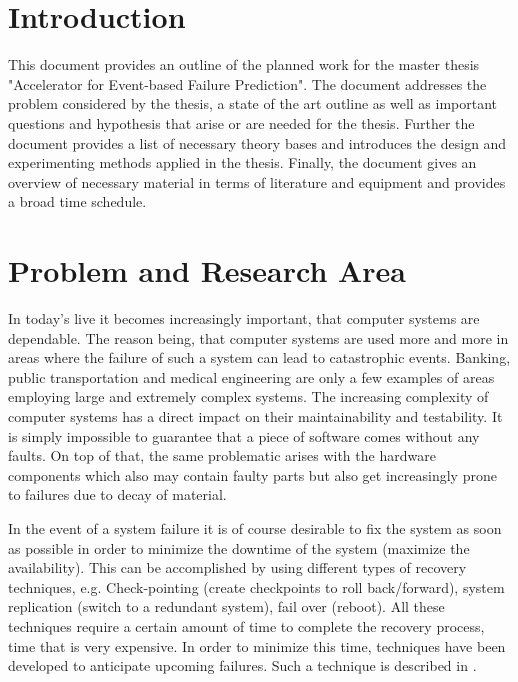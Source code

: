 \documentclass[12pt]{article} %
\begin{document}
\tableofcontents %

\newpage %


\section{Introduction} %

This document provides an outline of the planned work for the master thesis
"Accelerator for Event-based Failure Prediction". The document addresses the
problem considered by the thesis, a state of the art outline as well as
important questions and hypothesis that arise or are needed for the thesis.
Further the document provides a list of necessary theory bases and introduces
the design and experimenting methods applied in the thesis. Finally, the
document gives an overview of necessary material in terms of literature and
equipment and provides a broad time
schedule.


\section{Problem and Research Area} %

In today's live it becomes increasingly important, that computer systems are
dependable. The reason being, that computer systems are used more and more in
areas where the failure of such a system can lead to catastrophic events.
Banking, public transportation and medical engineering are only a few examples
of areas employing large and extremely complex systems. The increasing
complexity of computer systems has a direct impact on their maintainability and
testability. It is simply impossible to guarantee that a piece of software comes
without any faults. On top of that, the same problematic arises with the
hardware components which also may contain faulty parts but also get
increasingly prone to failures due to decay of material.

In the event of a system failure it is of course desirable to fix the system as
soon as possible in order to minimize the downtime of the system (maximize the
availability). This can be accomplished by using different types of recovery
techniques, e.g. Check-pointing (create checkpoints to roll back/forward),
system replication (switch to a redundant system), fail over (reboot). All these
techniques require a certain amount of time to complete the recovery process,
time that is very expensive. In order to minimize this time, techniques have
been developed to anticipate upcoming failures. Such a technique is described in
\cite{salfner08}.
\end{document}
